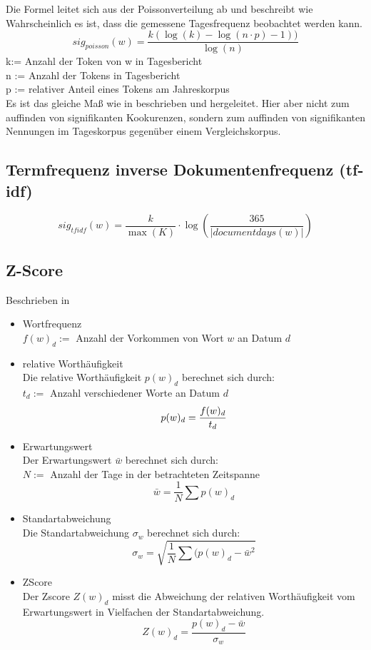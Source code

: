 Die Formel leitet sich aus der Poissonverteilung ab und beschreibt wie Wahrscheinlich es ist, dass die gemessene Tagesfrequenz beobachtet werden kann. 
\begin{equation}
sig_{poisson}(w) = \frac{k(\log(k)-\log(n\cdot p) -1 ))}{\log(n)}
\end{equation}
k:= Anzahl der Token von w in Tagesbericht\\
n := Anzahl der Tokens in Tagesbericht\\
p := relativer Anteil eines Tokens am Jahreskorpus\\
Es ist das gleiche Maß wie in \cite[S. 338-340]{heyer06} beschrieben und hergeleitet. Hier aber nicht zum auffinden von signifikanten Kookurenzen, sondern zum auffinden von signifikanten Nennungen im Tageskorpus gegenüber einem Vergleichskorpus.\\

\subsection{Termfrequenz inverse Dokumentenfrequenz (tf-idf)}
 \begin{equation}
sig_{tf idf}(w) = \frac{k}{\max(K)} \cdot \log ( \frac{365}{|documentdays(w)|})
\end{equation}

\subsection{Z-Score}
Beschrieben in \cite{benattar2011trend}\\

\begin{itemize}
	\item{Wortfrequenz}\\
		$f(w)_d :=$ Anzahl der Vorkommen von Wort $w$ an Datum $d$
	\item{relative Worthäufigkeit}\\
		Die relative Worthäufigkeit $p(w)_d$ berechnet sich durch: \\
		$t_d :=$ Anzahl verschiedener Worte an Datum $d$
		$$ p(w)_d = \frac{f(w)_d}{t_d} \\ $$
	\item{Erwartungswert}\\
		Der Erwartungswert $\bar{w}$ berechnet sich durch: \\
		$N:=$ Anzahl der Tage in der betrachteten Zeitspanne
		$$\bar{w}=\frac{1}{N} \sum p(w)_d$$
	\item{Standartabweichung}\\
		Die Standartabweichung $\sigma_w$ berechnet sich durch:
		$$\sigma_w = \sqrt{\frac{1}{N} \sum (p(w)_d - \bar{w}^2}$$
	\item{ZScore}\\
		Der Zscore $Z(w)_d$ misst die Abweichung der relativen Worthäufigkeit vom Erwartungswert in Vielfachen der Standartabweichung.
		$$Z(w)_d= \frac{p(w)_d - \bar{w}}{\sigma_w}$$		
		
\end{itemize}



